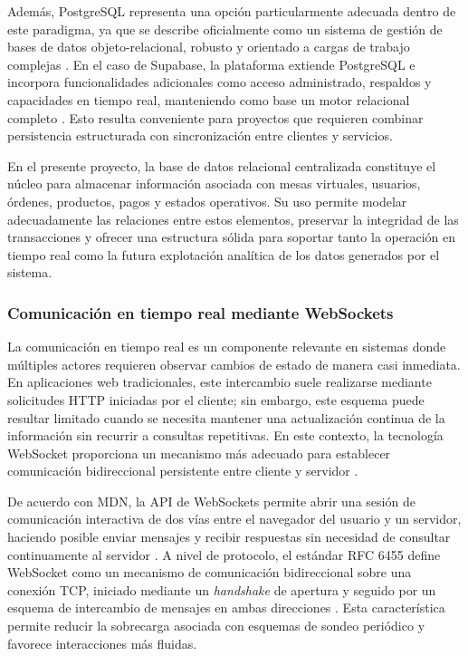 \documentclass[12pt]{report}
\begin{document}
Además, PostgreSQL representa una opción particularmente adecuada dentro de este paradigma, ya que se describe oficialmente como un sistema de gestión de bases de datos objeto-relacional, robusto y orientado a cargas de trabajo complejas \cite{postgresql_about_2026,postgresql_home_2026}. En el caso de Supabase, la plataforma extiende PostgreSQL e incorpora funcionalidades adicionales como acceso administrado, respaldos y capacidades en tiempo real, manteniendo como base un motor relacional completo \cite{supabase_docs_2026,supabase_database_overview_2026}. Esto resulta conveniente para proyectos que requieren combinar persistencia estructurada con sincronización entre clientes y servicios.

En el presente proyecto, la base de datos relacional centralizada constituye el núcleo para almacenar información asociada con mesas virtuales, usuarios, órdenes, productos, pagos y estados operativos. Su uso permite modelar adecuadamente las relaciones entre estos elementos, preservar la integridad de las transacciones y ofrecer una estructura sólida para soportar tanto la operación en tiempo real como la futura explotación analítica de los datos generados por el sistema.

\subsubsection{Comunicación en tiempo real mediante WebSockets}

La comunicación en tiempo real es un componente relevante en sistemas donde múltiples actores requieren observar cambios de estado de manera casi inmediata. En aplicaciones web tradicionales, este intercambio suele realizarse mediante solicitudes HTTP iniciadas por el cliente; sin embargo, este esquema puede resultar limitado cuando se necesita mantener una actualización continua de la información sin recurrir a consultas repetitivas. En este contexto, la tecnología WebSocket proporciona un mecanismo más adecuado para establecer comunicación bidireccional persistente entre cliente y servidor \cite{mdn_websockets_api_2025,rfc6455_2011}.

De acuerdo con MDN, la API de WebSockets permite abrir una sesión de comunicación interactiva de dos vías entre el navegador del usuario y un servidor, haciendo posible enviar mensajes y recibir respuestas sin necesidad de consultar continuamente al servidor \cite{mdn_websockets_api_2025}. A nivel de protocolo, el estándar RFC 6455 define WebSocket como un mecanismo de comunicación bidireccional sobre una conexión TCP, iniciado mediante un \textit{handshake} de apertura y seguido por un esquema de intercambio de mensajes en ambas direcciones \cite{rfc6455_2011}. Esta característica permite reducir la sobrecarga asociada con esquemas de sondeo periódico y favorece interacciones más fluidas.
\end{document}
